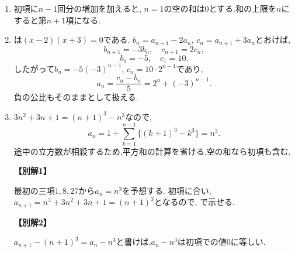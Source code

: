 \begin{enumerate}[label=\textbf{問\arabic*.},leftmargin=3.8em,format=\bookitemlink{practice-basic}{solution}{problem}]
  \item {}\BookMathLayout{}{\\}
    初項に$n-1$回分の増加を加えると,
    \BookMathLayout{\[
        \begin{aligned}
          a_n&=2+\sum_{k=1}^{n-1}(3k-1)\\
          &=2+\frac{3n(n-1)}2-(n-1)
          =\frac{3n^2-5n+6}{2}.
        \end{aligned}
      \]}{\[
        \begin{aligned}
          a_n&=2+\sum_{k=1}^{n-1}(3k-1)\\
          &=2+\frac{3n(n-1)}2-(n-1)\\
          &=\frac{3n^2-5n+6}{2}.
        \end{aligned}
      \]}
    $n=1$の空の和は$0$とする.和の上限を$n$にすると第$n+1$項になる.

  \item {}\BookMathLayout{}{\\}
    は$(x-2)(x+3)=0$である.
    $b_n=a_{n+1}-2a_n$, $c_n=a_{n+1}+3a_n$とおけば,
    \[
      b_{n+1}=-3b_n,\quad c_{n+1}=2c_n,
    \]
    \[
      b_1=-5,\quad c_1=10.
    \]
    したがって$b_n=-5(-3)^{n-1}$, $c_n=10\cdot2^{n-1}$であり,
    \[
      a_n=\frac{c_n-b_n}{5}=2^n+(-3)^{n-1}.
    \]
    負の公比もそのままとして扱える.

  \item {}\BookMathLayout{}{\\}
    $3n^2+3n+1=(n+1)^3-n^3$なので,
    \[
      a_n=1+\sum_{k=1}^{n-1}\{(k+1)^3-k^3\}=n^3.
    \]
    途中の立方数が相殺するため,平方和の計算を省ける.空の和なら初項も含む.
    \par\smallskip\noindent\textbf{【別解1】}\par
    最初の三項$1,8,27$から$a_n=n^3$を予想する.
    初項に合い,$a_{n+1}=n^3+3n^2+3n+1=(n+1)^3$となるので,
    で示せる.
    \par\smallskip\noindent\textbf{【別解2】}\par
    $a_{n+1}-(n+1)^3=a_n-n^3$と書けば,$a_n-n^3$は初項での値$0$に等しい.


\end{enumerate}
